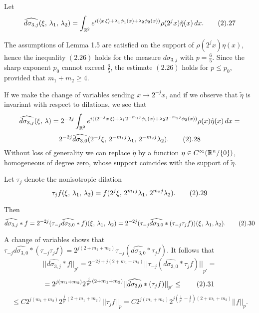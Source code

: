 Let
$$
\widehat{d\sigma_{3,j}}(\xi,\,\lambda_1,\,\lambda_2) =
\int_{{\Bbb R}^2} e^{i(
\langle x\,\xi\rangle+\lambda_1\phi_1(x)+\lambda_2\phi_2(x))}
\rho(2^jx)\tilde\eta(x)  \,dx.
\tag 2.27
$$

The assumptions of Lemma 1.5 are satisfied on the support of 
$\rho(2^jx)\eta(x)$,   hence  the inequality $(2.26)$ holds for the measure 
$d\sigma_{3,j}$ with $p=\frac{6}{5}$.
Since the sharp exponent $p_0$ cannot exceed   $\frac{6}{5}$,  
the estimate  $(2.26)$ holds for $p\leq p_0$, provided that $m_1+m_2 \ge 4$. 

If we make the change of variables sending $x \to 2^{-j}x$,  and if we observe 
that  $\tilde\eta$ is invariant with respect to dilations, we see that
$$ 
\widehat{d\sigma_{3,j}}(\xi,\,\lambda)= 
2^{-2j}\int_{{\Bbb R}^2} e^{i(
\langle 2^{-j}x\,\xi\rangle+\lambda_1 2^{-m_1j}\phi_1(x)+\lambda_2 2^{-m_2j}\phi_2(x))}
\rho(x)\tilde\eta(x)  \,dx = 
$$
$$
2^{-2j}  \widehat{d\sigma_{3,0}}(2^{-j}\xi, \,2^{-m_1j}\lambda_1,\,  
2^{-m_2j}\lambda_2).
\tag 2.28
$$
Without  loss of generality  we can replace $\tilde\eta$ by a function
$\eta\in C ^\infty({\Bbb R}^n\slash\{0\})$,  homogeneous of degree zero, 
whose support coincides with the  support of $\tilde \eta$.

Let $\tau_j$ denote the nonisotropic dilation
$$ \tau_j f(\xi,\,\lambda_1,\,\lambda_2)=
f(2^j\xi,\,2^{m_1j}\lambda_1,\, 2^{m_2j}\lambda_2).\tag 2.29
$$

Then
$$ \widehat{d\sigma_{3,j}}*f= 
2^{-2j}( \tau_{-j}  \widehat{d\sigma_{3,0}}*f)(\xi,\,\lambda_1,\,\lambda_2)=
2^{-2j}( \tau_{-j}  \widehat{d\sigma_{3,0}}*
( \tau_{-j} \tau_jf))(\xi,\,\lambda_1,\lambda_2).\tag 2.30
$$

A change of variables shows that 
$ \tau_{-j}  \widehat{d\sigma_{3,0}}*(\tau_{-j} \tau_jf)=
2^{j(2+m_1+m_2)} \tau_{-j}(\widehat{d\sigma_{3,0}}*\tau_jf).$
It follows that 
$${||{  \widehat{d\sigma_{3,j}}*f}||}_{p'}= 
2^{-2j+ j(2+m_1+m_2)}
{||{ \tau_{-j}(\widehat{d\sigma_{3,0}}*\tau_jf)}||}_{p'}=$$
$$=2^{j(m_1+ m_2)}
2^{\frac{j}{p'} (2+m_1+ m_2)}
{||{  \widehat{d\sigma_{3,0}}*( \tau_jf)}||}_{p'}\leq
\tag 2.31
$$
$$\leq C 2^{j(m_1+ m_2)}
2^{\frac{j}{p'} (2+m_1+m_2)}
{||{ \tau_jf}||}_{p}= 
C2^{j(m_1+ m_2)}
2^{j\left(\frac{1}{ p'}-\frac{1}{p}\right) (2+m_1+ m_2)}
{||{f}||}_{p}.
$$

